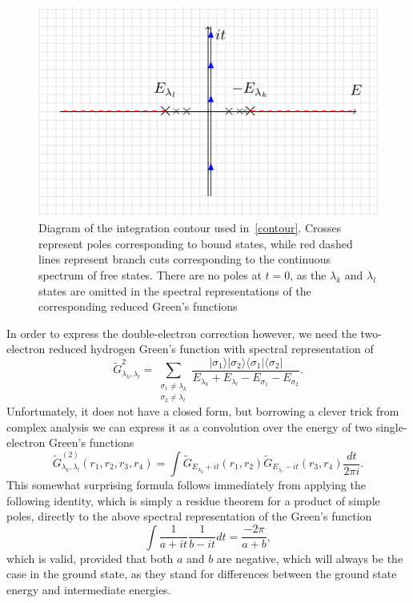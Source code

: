 	\begin{figure}
			\centering
			\includegraphics[width=120mm]{Graphs/Contour.pdf} 
			\caption{Diagram of the integration contour used in~\eqref{contour}. Crosses represent poles corresponding to bound states, while red dashed lines represent branch cuts corresponding to the continuous spectrum of free states. There are no poles at $t=0$, as the $\lambda_k$ and $\lambda_l$ states are omitted in the spectral representations of the corresponding reduced Green's functions} \label{degeneracyFig}
		\end{figure}
	
In order to express the double-electron correction however, we need the two-electron reduced hydrogen Green's function with spectral representation of
\begin{equation}
\widetilde{G}_{\lambda_k,\lambda_l}^2 = \sum_{\substack{\sigma_1 \neq \lambda_k\\\sigma_2 \neq \lambda_l}} \frac{|\sigma_1\rangle |\sigma_2\rangle \langle
	\sigma_1| \langle \sigma_2|}{E_{\lambda_k} + E_{\lambda_l} -
	E_{\sigma_1} - E_{\sigma_2}}.\label{eq:16}
\end{equation}
Unfortunately, it does not have a closed form, but borrowing a clever trick from complex analysis we can express it as a convolution over the energy of two single-electron Green's functions
\begin{equation}
\widetilde{G}^{(2)}_{\lambda_k,\lambda_l} (r_1,r_2,r_3,r_4) = \int
\widetilde{G}_{E_{\lambda_k}+it}(r_1,r_2)\widetilde{G}_{E_{\lambda_l}-it}(r_3,r_4)
\frac{dt}{2 \pi i}\label{contour} .
\end{equation}
This somewhat surprising formula follows immediately from applying the
following identity, which is simply a residue theorem for a product of
simple poles, directly to the above spectral representation of the Green's function
\begin{equation}
\int \frac{1}{a+it}\frac{1}{b-it}dt = \frac{-2 \pi}{a+b},\label{eq:18}
\end{equation}
which is valid, provided that both $a$ and $b$ are negative,
which will always be the case in the ground state, as they stand for
differences between the ground state energy and intermediate energies.

